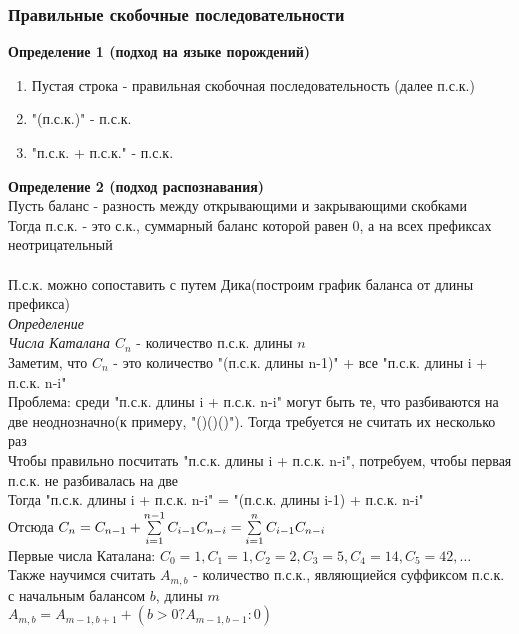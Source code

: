 \documentclass[12pt]{article}
\begin{document}
\subsubsection{Правильные скобочные последовательности}
\textbf{Определение 1 (подход на языке порождений)}
\begin{enumerate}
    \item Пустая строка - правильная скобочная последовательность (далее п.с.к.)
    \item "(п.с.к.)" - п.с.к.
    \item "п.с.к. + п.с.к." - п.с.к.
\end{enumerate}
\textbf{Определение 2 (подход распознавания)}\\
Пусть баланс - разность между открывающими и закрывающими скобками\\
Тогда п.с.к. - это с.к., суммарный баланс которой равен 0, а на всех префиксах неотрицательный\\\\
П.с.к. можно сопоставить с путем Дика(построим график баланса от длины префикса)\\
\textit{Определение}\\
\textit{Числа Каталана $C_n$} - количество п.с.к. длины $n$\\
Заметим, что $C_n$ - это количество "(п.с.к. длины n-1)" + все "п.с.к. длины i + п.с.к. n-i"\\
Проблема: среди "п.с.к. длины i + п.с.к. n-i" могут быть те, что разбиваются на две неоднозначно(к примеру, "()()()"). Тогда требуется не считать их несколько раз\\
Чтобы правильно посчитать "п.с.к. длины i + п.с.к. n-i", потребуем, чтобы первая п.с.к. не разбивалась на две\\
Тогда "п.с.к. длины i + п.с.к. n-i" = "(п.с.к. длины i-1) + п.с.к. n-i"\\
Отсюда $C_n = C_{n-1} + \sum\limits_{i=1}^{n-1}C_{i-1}C_{n-i} = \sum\limits_{i=1}^{n}C_{i-1}C_{n-i}$\\
Первые числа Каталана: $C_0 = 1, C_1 = 1, C_2 = 2, C_3 = 5, C_4 = 14, C_5 = 42, \ldots$\\
Также научимся считать $A_{m,b}$ - количество п.с.к., являющиейся суффиксом п.с.к. с начальным балансом $b$, длины $m$\\
$A_{m,b} = A_{m-1, b+1}+(b > 0 ? A_{m-1,b-1} : 0)$
\end{document}
